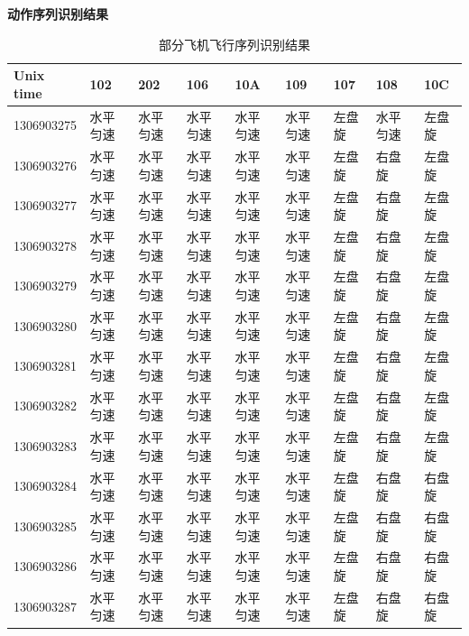 \documentclass{my_paper}
\begin{document}
\textbf{动作序列识别结果}
\begin{table}
    \caption{部分飞机飞行序列识别结果} %
    \centering %
  
        \begin{tabular}{l|llllllll}
            \hline
        Unix time & 102 & 202 & 106 & 10A & 109 & 107 & 108 & 10C \\\hline
        1306903275 & 水平匀速 & 水平匀速 & 水平匀速 & 水平匀速 & 水平匀速 & 左盘旋 & 水平匀速 & 左盘旋 \\
        1306903276 & 水平匀速 & 水平匀速 & 水平匀速 & 水平匀速 & 水平匀速 & 左盘旋 & 右盘旋  & 左盘旋 \\
        1306903277 & 水平匀速 & 水平匀速 & 水平匀速 & 水平匀速 & 水平匀速 & 左盘旋 & 右盘旋  & 左盘旋 \\
        1306903278 & 水平匀速 & 水平匀速 & 水平匀速 & 水平匀速 & 水平匀速 & 左盘旋 & 右盘旋  & 左盘旋 \\
        1306903279 & 水平匀速 & 水平匀速 & 水平匀速 & 水平匀速 & 水平匀速 & 左盘旋 & 右盘旋  & 左盘旋 \\
        1306903280 & 水平匀速 & 水平匀速 & 水平匀速 & 水平匀速 & 水平匀速 & 左盘旋 & 右盘旋  & 左盘旋 \\
        1306903281 & 水平匀速 & 水平匀速 & 水平匀速 & 水平匀速 & 水平匀速 & 左盘旋 & 右盘旋  & 左盘旋 \\
        1306903282 & 水平匀速 & 水平匀速 & 水平匀速 & 水平匀速 & 水平匀速 & 左盘旋 & 右盘旋  & 左盘旋 \\
        1306903283 & 水平匀速 & 水平匀速 & 水平匀速 & 水平匀速 & 水平匀速 & 左盘旋 & 右盘旋  & 左盘旋 \\
        1306903284 & 水平匀速 & 水平匀速 & 水平匀速 & 水平匀速 & 水平匀速 & 左盘旋 & 右盘旋  & 右盘旋 \\
        1306903285 & 水平匀速 & 水平匀速 & 水平匀速 & 水平匀速 & 水平匀速 & 左盘旋 & 右盘旋  & 右盘旋 \\
        1306903286 & 水平匀速 & 水平匀速 & 水平匀速 & 水平匀速 & 水平匀速 & 左盘旋 & 右盘旋  & 右盘旋 \\
        1306903287 & 水平匀速 & 水平匀速 & 水平匀速 & 水平匀速 & 水平匀速 & 左盘旋 & 右盘旋  & 右盘旋\\\hline
        \end{tabular}
     
    \label{dongzuo}
    \end{table}
\end{document}
